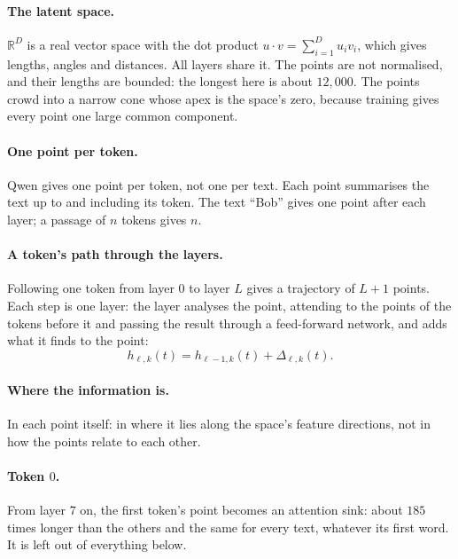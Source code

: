 \documentclass[11pt]{article}
\theoremstyle{remark}
\newcommand{\R}{\mathbb{R}}
\begin{document}
\paragraph{The latent space.} $\R^D$ is a real vector space with the dot product $u \cdot v = \sum_{i=1}^{D} u_i v_i$, which gives lengths, angles and distances. All layers share it. The points are not normalised, and their lengths are bounded: the longest here is about $12{,}000$. The points crowd into a narrow cone whose apex is the space's zero, because training gives every point one large common component.

\paragraph{One point per token.} Qwen gives one point per token, not one per text. Each point summarises the text up to and including its token. The text ``Bob'' gives one point after each layer; a passage of $n$ tokens gives $n$.

\paragraph{A token's path through the layers.} Following one token from layer $0$ to layer $L$ gives a trajectory of $L+1$ points. Each step is one layer: the layer analyses the point, attending to the points of the tokens before it and passing the result through a feed-forward network, and adds what it finds to the point:
\begin{equation}
h_{\ell,k}(t) = h_{\ell-1,k}(t) + \Delta_{\ell,k}(t) .
\end{equation}

\paragraph{Where the information is.} In each point itself: in where it lies along the space's feature directions, not in how the points relate to each other.

\paragraph{Token $0$.} From layer $7$ on, the first token's point becomes an attention sink: about $185$ times longer than the others and the same for every text, whatever its first word. It is left out of everything below.
\end{document}
